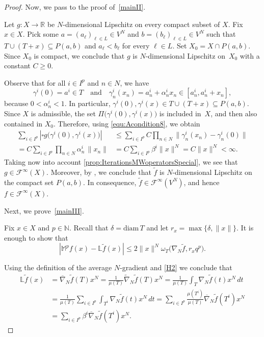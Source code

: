 \documentclass{amsart}
\theoremstyle{plain}%
\theoremstyle{definition}
\theoremstyle{remark}
\begin{document}
\begin{proof}
Now, we pass to the proof of~\ref{mainII}.
	
Let $g\colon X\to\mathbb{R}$ be $N$\nobreakdash-dimensional Lipschitz on every compact subset of $X$. Fix $x\in X$. Pick some $a=(a_\ell)_{\ell\in L}\in V^N$ and $b=(b_\ell)_{\ell\in L}\in V^N$ such that $T\cup(T+x)\subseteq P(a,b)$ and $a_\ell< b_\ell$ for every $\ell\in L$. Set $X_0=X\cap P(a,b)$. Since $X_0$ is compact, we conclude that $g$ is $N$\nobreakdash-dimensional Lipschitz on~$X_0$ with a constant $C\ge 0$. 

Observe that for all $i\in I^p$ and	$n\in N$, we have
\begin{equation*}
\gamma^i(0)=a^i\in T\quad\text{and}\quad \gamma^i_n(x_n)=a^i_n+\alpha^i_nx_n\in[a^i_n,a^i_n+x_n],
\end{equation*}
because $0<\alpha^i_n<1$. In particular, $\gamma^i(0),\gamma^i(x)\in T\cup(T+x)\subseteq P(a,b)$. Since $X$ is admissible, the set $\Pi\big(\gamma^i(0),\gamma^i(x)\big)$ is included in~$X$, and then also contained in $X_0$. Therefore, using \eqref{equ:Acondition8}, we obtain
\begin{align*}
\sum_{i\in I^p}\left|\square g\big(\gamma^i(0),\gamma^i(x)\big)\right|
&\le  \sum_{i\in I^p} C\prod_{n\in N}\big\|\gamma^i_n(x_n)-\gamma^i_n(0)\big\|\\
=C\sum_{i\in I^p}\prod_{n\in N}\alpha^i_n\,\|x_n\|
&=C\sum_{i\in I^p}\beta^i\|x\|^{N} =C\|x\|^{N}<\infty.
\end{align*}
Taking now into account \cref{prop:IterationsMWoperatorsSpecial}, we see that $g\in\mathcal{F}^\infty(X)$. Moreover, by , we conclude that $\widetilde{f}$ is $N$\nobreakdash-dimensional Lipschitz on the compact set $P(a,b)$. In consequence, $\widetilde{f}\in \mathcal{F}^\infty(V^N)$, and hence $f\in \mathcal{F}^\infty(X)$. 
	
Next, we prove~\ref{mainIII}. 

Fix $x\in X$ and $p\in \mathbb{N}$. Recall that $\delta=\text{diam}\,T$ and let $r_x=\max\{\delta,\|x\|\}$. It is enough to show that 
\begin{equation}\label{equ:estimationMp_minus_L}
|\mathbb{M}^pf(x)-\mathbb{L}\widetilde{f}(x)|\le2\|x\|^N\omega_T\big(\nabla_N\widetilde{f},r_xq^p\big).
\end{equation}
	
Using the definition of the average $N$\nobreakdash-gradient and \ref{H2} we conclude that 
\begin{align*}
\mathbb{L}\widetilde{f}(x)&=\overline{\nabla}\!_{N}\widetilde{f}(T) x^N
=\tfrac1{\mu(T)}\widetilde{\nabla}\!_{N}\widetilde{f}(T) x^N
=\tfrac1{\mu(T)}\int_T\nabla\!_N\widetilde{f}(t)x^N\,dt\\
&=\tfrac1{\mu(T)}\sum_{i\in I^p}\int_{T^i}\nabla\!_N\widetilde{f}(t)x^N\,dt
=\sum_{i\in I^p}\tfrac{\mu(T^i)}{\mu(T)}\overline{\nabla}\!_N\widetilde{f}(T^i)x^N\\
&=\sum_{i\in I^p}\beta^i\overline{\nabla}\!_N\widetilde{f}(T^i)x^N.
\end{align*}


\end{proof}
\end{document}
